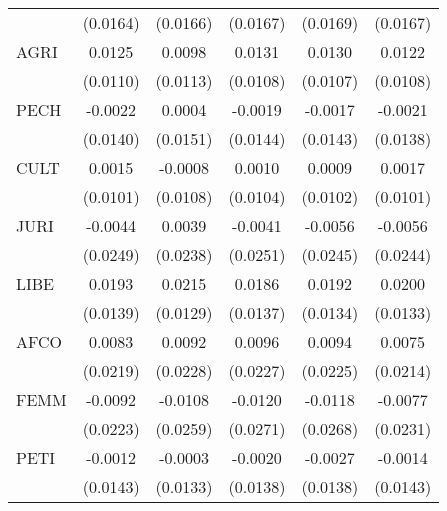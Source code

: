 \begin{tabular}{lccccc}
                                       & (0.0164)      & (0.0166)     & (0.0167)      & (0.0169)      & (0.0167)\\   
   AGRI                                & 0.0125        & 0.0098       & 0.0131        & 0.0130        & 0.0122\\   
                                       & (0.0110)      & (0.0113)     & (0.0108)      & (0.0107)      & (0.0108)\\   
   PECH                                & -0.0022       & 0.0004       & -0.0019       & -0.0017       & -0.0021\\   
                                       & (0.0140)      & (0.0151)     & (0.0144)      & (0.0143)      & (0.0138)\\   
   CULT                                & 0.0015        & -0.0008      & 0.0010        & 0.0009        & 0.0017\\   
                                       & (0.0101)      & (0.0108)     & (0.0104)      & (0.0102)      & (0.0101)\\   
   JURI                                & -0.0044       & 0.0039       & -0.0041       & -0.0056       & -0.0056\\   
                                       & (0.0249)      & (0.0238)     & (0.0251)      & (0.0245)      & (0.0244)\\   
   LIBE                                & 0.0193        & 0.0215       & 0.0186        & 0.0192        & 0.0200\\   
                                       & (0.0139)      & (0.0129)     & (0.0137)      & (0.0134)      & (0.0133)\\   
   AFCO                                & 0.0083        & 0.0092       & 0.0096        & 0.0094        & 0.0075\\   
                                       & (0.0219)      & (0.0228)     & (0.0227)      & (0.0225)      & (0.0214)\\   
   FEMM                                & -0.0092       & -0.0108      & -0.0120       & -0.0118       & -0.0077\\   
                                       & (0.0223)      & (0.0259)     & (0.0271)      & (0.0268)      & (0.0231)\\   
   PETI                                & -0.0012       & -0.0003      & -0.0020       & -0.0027       & -0.0014\\   
                                       & (0.0143)      & (0.0133)     & (0.0138)      & (0.0138)      & (0.0143)\\   

\end{tabular}
